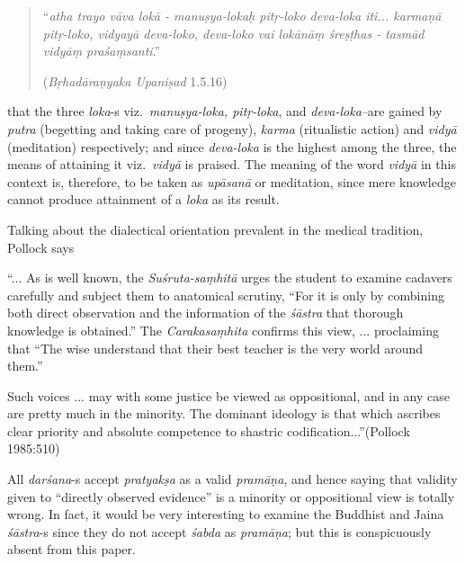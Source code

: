 \begin{quote}
``{\sl atha trayo vāva lokā - manuṣya-lokaḥ pitṛ-loko deva-loka iti...
karmaṇā pitṛ-loko, vidyayā deva-loko, deva-loko vai lokānāṃ śreṣṭhas - tasmād vidyāṃ praśaṃsanti}.'' 

\hfill({\sl Bṛhadāraṇyaka Upaniṣad} 1.5.16)
\end{quote}
that the three {\sl loka}-s viz.\ {\sl manuṣya-loka, pitṛ-loka}, and {\sl deva-loka}--are gained by {\sl putra} (begetting and taking care of progeny), {\sl karma} (ritualistic action) and {\sl vidyā} (meditation) respectively; and since {\sl deva-loka} is the highest among the three, the means of attaining it viz.\ {\sl vidyā} is praised. The meaning of the word {\sl vidyā} in this context is, therefore, to be taken as {\sl upāsanā} or meditation, since mere knowledge cannot produce attainment of a {\sl loka} as its result.

Talking about the dialectical orientation prevalent in the medical tradition, Pollock says

\newpage

\begin{myquote}
``... As is well known, the {\sl Suśruta-saṃhitā} urges the student to examine cadavers carefully and subject them to anatomical scrutiny, ``For it is only by combining both direct observation and the information of the {\sl śāstra} that thorough knowledge is obtained.'' The {\sl Carakasaṃhita} conﬁrms this view, ... proclaiming that ``The wise understand that their best teacher is the very world around them.''

Such voices ... may with some justice be viewed as oppositional, and in any case are pretty much in the minority. The dominant ideology is that which ascribes clear priority and absolute competence to shastric codiﬁcation...''\hfill (Pollock 1985:510)
\end{myquote}

All {\sl darśana}-s accept {\sl pratyakṣa} as a valid {\sl pramāṇa}, and hence saying that validity given to ``directly observed evidence'' is a minority or oppositional view is totally wrong. In fact, it  would be very interesting to examine the Buddhist and Jaina {\sl śāstra}-s since they do not accept {\sl śabda} as {\sl pramāṇa}; but this is conspicuously absent from this paper.

